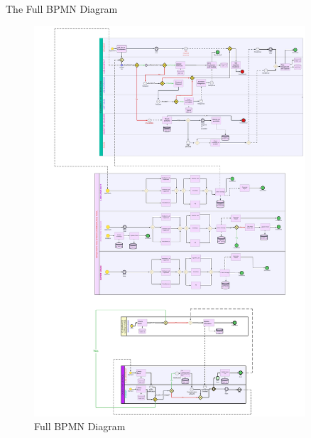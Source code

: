 \documentclass[20pt]{beamer}
\numberwithin{figure}{section}
\begin{document}
\begin{frame}{The Full BPMN Diagram}

     \begin{figure}
        \centering
        \includegraphics[width= 0.9\textwidth , height= 0.8\paperheight]{Full_BPMN.jpeg}
        \caption{{Full BPMN Diagram}}
        \label{fig:17}
    \end{figure}

\end{frame}
\end{document}
